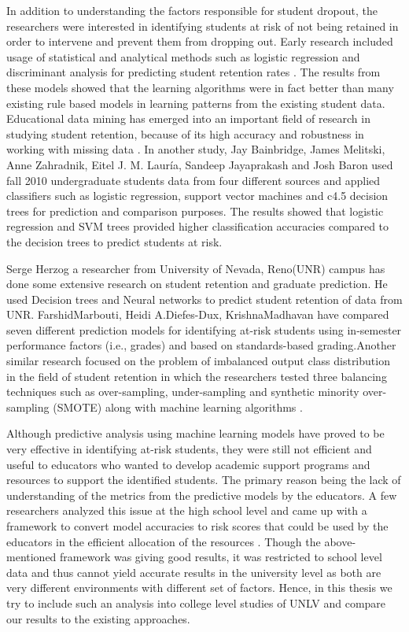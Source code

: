 \documentclass[11pt,openright]{report}
\begin{document}
In addition to understanding the factors responsible for student dropout, the researchers were interested in identifying students at risk of not being retained in order to intervene and prevent them from dropping out. Early research included usage of statistical and analytical methods such as logistic regression and discriminant analysis for predicting student retention rates \cite{lakkaraju2015machine,marbouti2016models,adejo2017}. The results from these models showed that the learning algorithms were in fact better than many existing rule based models in learning patterns from the existing student data. Educational data mining has emerged into an important field of research in studying student retention, because of its high accuracy and robustness in working with missing data \cite{alkhasawneh2014developing}. In another study, Jay Bainbridge, James Melitski, Anne Zahradnik, Eitel J. M. Lauría, Sandeep Jayaprakash and Josh Baron used fall 2010 undergraduate students data from four different sources and applied classifiers such as logistic regression, support vector machines and c4.5 decision trees for prediction and comparison purposes\cite{bainbridge2015}. The results showed that logistic regression and SVM trees provided higher classification accuracies compared to the decision trees to predict students at risk. 

Serge Herzog a researcher from University of Nevada, Reno(UNR) campus has done some extensive research on student retention and graduate prediction. He used Decision trees and Neural networks to predict student retention of data from UNR\cite{herzog2006estimating}. FarshidMarbouti, Heidi A.Diefes-Dux, KrishnaMadhavan \cite{marbouti2016models} have compared seven different prediction models for identifying at-risk students using in-semester performance factors (i.e., grades) and based on standards-based grading.Another similar research focused on the problem of imbalanced output class distribution in the field of student retention in which the researchers tested three balancing techniques such as over-sampling, under-sampling and synthetic minority over-sampling (SMOTE) along with machine learning algorithms \cite{thammasiri2014critical}.

Although predictive analysis using machine learning models have proved to be very effective in identifying at-risk students, they were still not efficient and useful to educators who wanted to develop academic support programs and resources to support the identified students. The primary reason being the lack of understanding of the metrics from the predictive models by the educators. A few researchers analyzed this issue at the high school level and came up with a framework to convert model accuracies to risk scores that could be used by the educators in the efficient allocation of the resources \cite{lakkaraju2015machine}. Though the above-mentioned framework was giving good results, it was restricted to school level data and thus cannot yield accurate results in the university level as both are very different environments with different set of factors. Hence, in this thesis we try to include such an analysis into college level studies of UNLV and compare our results to the existing approaches.
\end{document}
